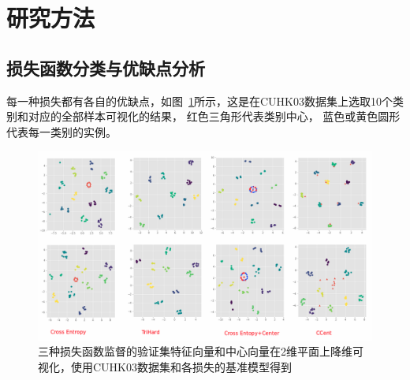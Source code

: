 \section{研究方法}
\subsection{损失函数分类与优缺点分析}

每一种损失都有各自的优缺点，如图~\ref{fig:losses}所示，这是在CUHK03数据集上选取10个类别和对应的全部样本可视化的结果，
红色三角形代表类别中心，
蓝色或黄色圆形代表每一类别的实例。

\begin{figure}
	\centering
	\includegraphics[width=1.1\textwidth]{fig/2018-05-16-15-03-54.png}
	\caption{三种损失函数监督的验证集特征向量和中心向量在2维平面上降维可视化，使用CUHK03数据集和各损失的基准模型得到}
	\label{fig:losses}
\end{figure}

